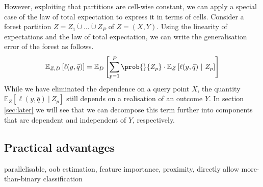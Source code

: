 \documentclass[../main.tex]{subfiles}
\begin{document}
However, exploiting that partitions are cell-wise constant, we can apply a special case of the law of total expectation to express it in terms of cells.
Consider a forest partition $Z = Z_{1} \dot\cup \dots \dot\cup Z_{P}$ of $Z=(X,Y)$. Using the linearity of expectations and the law of total expectation, we can write the generalisation error of the forest as follows. 
$$
\mathbb{E}_{Z,D}\left[ \ell(y,\bar{q}) \right] = \mathbb{E}_{D}\left[ \sum_{p=1}^P \prob{}{Z_{p}} \cdot \mathbb{E}_{Z}\left[ \ell(y, \bar{q}) ~|~Z_{p}\right]   \right] 
$$
While we have eliminated the dependence on a query point $X$, the quantity $\mathbb{E}_{Z}\left[ \ell(y, \bar{q}) ~|~Z_{p}\right]$ still depends on a realisation of an outcome $Y$. In section \ref{sec:later} we will see that we can decompose this term further into components that are dependent and independent of $Y$, respectively.

\subsection{Practical advantages}
parallelisable, oob estimation, feature importance, proximity, directly allow more-than-binary classification
\end{document}
